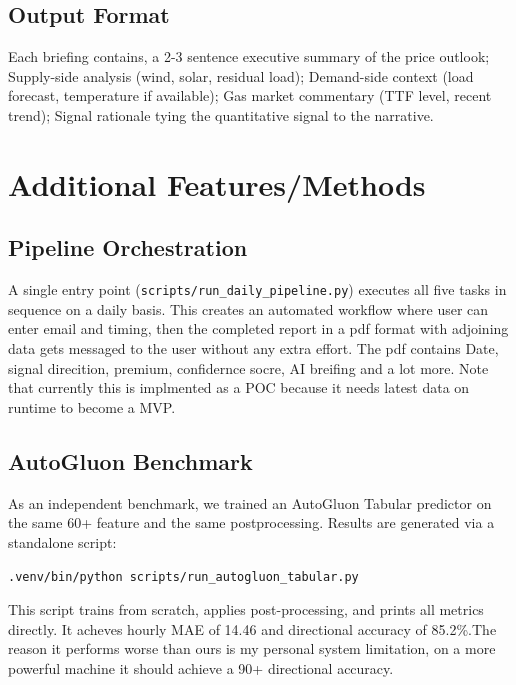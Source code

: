 \documentclass[11pt,a4paper]{article}
\begin{document}
\subsection{Output Format}

Each briefing contains, a 2-3 sentence executive summary of the price outlook; Supply-side analysis (wind, solar, residual load); Demand-side context (load forecast, temperature if available); Gas market commentary (TTF level, recent trend); Signal rationale tying the quantitative signal to the narrative.




\section{Additional Features/Methods}
\label{sec:task5}

\subsection{Pipeline Orchestration}

A single entry point (\texttt{scripts/run\_daily\_pipeline.py}) executes all five tasks in sequence on a daily basis. This creates an automated workflow where user can enter email and timing, then the completed report in a pdf format with adjoining data gets messaged to the user without any extra effort. The pdf contains Date, signal direcition, premium, confidernce socre, AI breifing and a lot more. Note that currently this is implmented as a POC because it needs latest data on runtime to become a MVP.

\subsection{AutoGluon Benchmark}

As an independent benchmark, we trained an AutoGluon Tabular predictor on the same 60+ feature and the same postprocessing. Results are generated via a standalone script:

\centerline{\texttt{.venv/bin/python scripts/run\_autogluon\_tabular.py}}

This script trains from scratch, applies post-processing, and prints all metrics directly. It acheves hourly MAE of 14.46 and directional accuracy of 85.2\%.The reason it performs worse than ours is my personal system limitation, on a more powerful machine it should achieve a 90+ directional accuracy.
\end{document}
